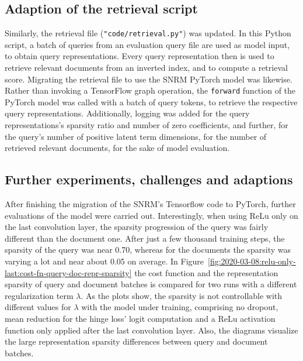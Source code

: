 \subsection{Adaption of the retrieval script}
Similarly, the retrieval file (\texttt{"code/retrieval.py"}) was updated.
In this Python script, a batch of queries from an evaluation query file are used as model input,
    to obtain query representations.
Every query representation then is used to retrieve relevant documents from an inverted index,
    and to compute a retrieval score.
Migrating the retrieval file to use the SNRM PyTorch model was likewise.
Rather than invoking a TensorFlow graph operation, the \texttt{forward} function 
    of the PyTorch model was called with a batch of query tokens,
    to retrieve the respective query representations.
Additionally, logging was added for the query representations's sparsity ratio and number of zero coefficients,
    and further, for the query's number of positive latent term dimensions, 
    for the number of retrieved relevant documents, for the sake of model evaluation.

\subsection{Further experiments, challenges and adaptions}
After finishing the migration of the SNRM's Tensorflow code to PyTorch,
    further evaluations of the model were carried out.
Interestingly, when using ReLu only on the last convolution layer,
    the sparsity progression of the query was fairly different than the document one.
After just a few thousand training steps, the sparsity of the query was near 0.70,
    whereas for the documents the sparsity was varying a lot and near about 0.05 on average.
In Figure~\ref{fig:2020-03-08:relu-only-last:cost-fn-query-doc-repr-sparsity} the cost function and 
    the representation sparsity of query and document batches is compared for two runs with a different regularization 
    term $\lambda$.
As the plots show, the sparsity is not controllable with different values for $\lambda$ with the model
    under training, comprising no dropout, mean reduction for the hinge loss' logit computation
    and a ReLu activation function only applied after the last convolution layer.
Also, the diagrams visualize the large representation sparsity differences between query and document batches.


